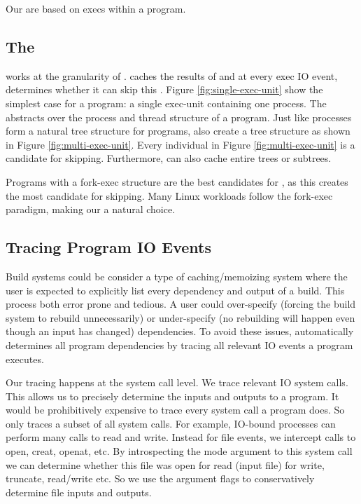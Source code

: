 Our \cacheunit{} are based on execs within a program.


\subsection{The \cacheunit}
\pc works at the granularity of \cacheunit. \pc caches the results of \cacheunit{} and at every exec
IO event, determines whether it can skip this \cacheunit. Figure \ref{fig:single-exec-unit} show the simplest
case for a program: a single exec-unit containing one process. The \cacheunit{} abstracts over the process and
thread structure of a program. Just like processes form a natural tree structure for programs, \cacheunit{} also
create a tree structure as shown in Figure \ref{fig:multi-exec-unit}. Every individual \cacheunit{} in Figure \ref{fig:multi-exec-unit} is a candidate for skipping. Furthermore, \pc can also cache entire \cacheunit
trees or subtrees.

Programs with a fork-exec structure are the best candidates for \pc, as this creates the most candidate \cacheunit{} for skipping. Many Linux workloads follow the fork-exec paradigm, making our \cacheunit{} a natural choice.

\subsection{Tracing Program IO Events}
Build systems could be consider a type of caching/memoizing system where the user is expected to explicitly list every dependency and output of a build. This process both error prone and tedious. A user could over-specify (forcing the build system to rebuild unnecessarily) or under-specify (no rebuilding will happen even though an input has changed) dependencies. To avoid these issues, \pc automatically determines all program dependencies by tracing all relevant IO events a program executes.

Our tracing happens at the system call level. We trace relevant IO system calls. This allows us to precisely determine the inputs and outputs to a program. It would be prohibitively expensive to trace every system call a program does. So \pc only traces a subset of all system calls. For example, IO-bound processes can perform many calls to read and write. Instead for file events, we intercept calls to open, creat, openat, etc. By introspecting the mode argument to this system call we can determine whether this file was open for read (input file) for write, truncate, read/write etc. So we use the argument flags to conservatively determine file inputs and outputs.

